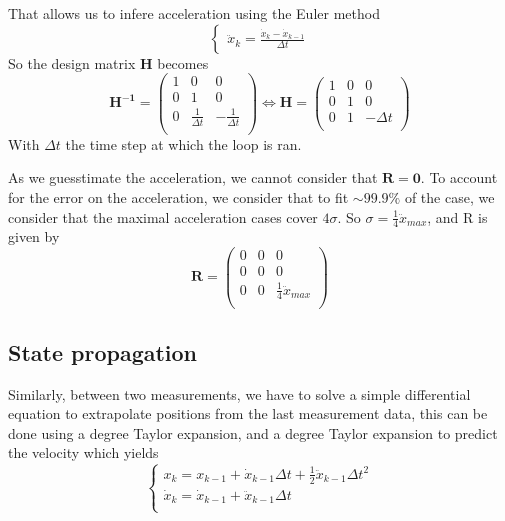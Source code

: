 \documentclass[12pt]{article}
\begin{document}
That allows us to infere acceleration using the Euler method
\begin{equation}
\left\{
    \begin{array}{l}
    \ddot{x}_k = \frac{\dot{x}_k - \dot{x}_{k-1}}{\Delta{t}}
    \end{array}
\right.
\end{equation}
So the design matrix $\mathbf{H}$ becomes
\begin{equation}
\mathbf{H^{-1}} =
    \begin{pmatrix}
        1 & 0 & 0 \\
        0 & 1 & 0 \\
        0 & \frac{1}{\Delta{t}} & -\frac{1}{\Delta{t}} \\
    \end{pmatrix}
\iff
\mathbf{H} =
    \begin{pmatrix}
        1 & 0 & 0 \\
        0 & 1 & 0 \\
        0 & 1 & -\Delta{t} \\
    \end{pmatrix}
\end{equation}
With $\Delta{t}$ the time step at which the loop is ran.

As we guesstimate the acceleration, we cannot consider that $\mathbf{R} = \mathbf{0}$.
To account for the error on the acceleration, we consider that to fit $\sim 99.9\%$ of the case, we consider that the maximal acceleration cases cover $4\sigma$.
So $\sigma = \frac{1}{4}\ddot{x}_{max}$, and R is given by
\begin{equation}
\mathbf{R} =
    \begin{pmatrix}
        0 & 0 & 0 \\
        0 & 0 & 0 \\
        0 & 0 & \frac{1}{4}\ddot{x}_{max} \\
    \end{pmatrix}
\end{equation}


\subsection{State propagation}
Similarly, between two measurements, we have to solve a simple differential equation to extrapolate positions from the last measurement data, this can be done using a  degree Taylor expansion, and a  degree Taylor expansion to predict the velocity which yields
\begin{equation}
\left\{
    \begin{array}{l}
    x_k
    = x_{k-1} + \dot{x}_{k-1}\Delta{t} + \frac{1}{2}\ddot{x}_{k-1}\Delta{t}^2 \\
    \dot{x}_k
    = \dot{x}_{k-1} + \ddot{x}_{k-1}\Delta{t} \\
    \end{array}
\right.
\end{equation}
\end{document}
